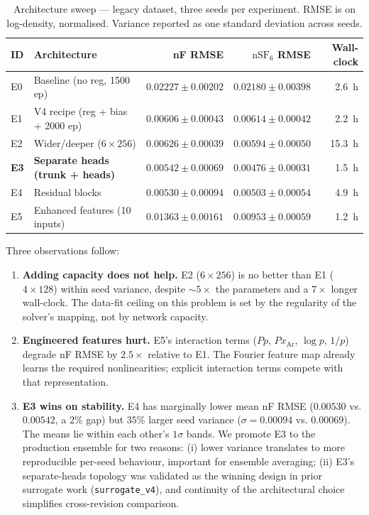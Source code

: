 \begin{table}[h]
\centering
\caption{Architecture sweep — legacy dataset, three seeds per experiment.
RMSE is on log-density, normalised. Variance reported as one standard deviation
across seeds.}
\label{tab:ml-arch-sweep}
\small
\begin{tabular}{l l r r r}
\toprule
ID & Architecture & nF RMSE & $\mathrm{nSF}_6$ RMSE & Wall-clock \\
\midrule
E0 & Baseline (no reg, 1500 ep)        & $0.02227 \pm 0.00202$ & $0.02180 \pm 0.00398$ & \SI{2.6}{\hour} \\
E1 & V4 recipe (reg + bias + 2000 ep)  & $0.00606 \pm 0.00043$ & $0.00614 \pm 0.00042$ & \SI{2.2}{\hour} \\
E2 & Wider/deeper ($6 \times 256$)     & $0.00626 \pm 0.00039$ & $0.00594 \pm 0.00050$ & \SI{15.3}{\hour} \\
\textbf{E3} & \textbf{Separate heads (trunk + heads)} & $\mathbf{0.00542 \pm 0.00069}$ & $\mathbf{0.00476 \pm 0.00031}$ & \SI{1.5}{\hour} \\
E4 & Residual blocks                   & $0.00530 \pm 0.00094$ & $0.00503 \pm 0.00054$ & \SI{4.9}{\hour} \\
E5 & Enhanced features (10 inputs)     & $0.01363 \pm 0.00161$ & $0.00953 \pm 0.00059$ & \SI{1.2}{\hour} \\
\bottomrule
\end{tabular}
\end{table}

Three observations follow:

\begin{enumerate}[itemsep=2pt,topsep=2pt]
  \item \textbf{Adding capacity does not help.} E2 ($6\times256$) is no better
  than E1 ($4\times128$) within seed variance, despite $\sim$$5\times$ the
  parameters and a $7\times$ longer wall-clock. The data-fit ceiling on this
  problem is set by the regularity of the solver's mapping, not by network
  capacity.
  \item \textbf{Engineered features hurt.} E5's interaction terms
  ($Pp$, $P x_\mathrm{Ar}$, $\log p$, $1/p$) degrade nF RMSE by
  $2.5\times$ relative to E1. The Fourier feature map already learns the
  required nonlinearities; explicit interaction terms compete with that
  representation.
  \item \textbf{E3 wins on stability.} E4 has marginally lower mean nF RMSE
  ($0.00530$ vs. $0.00542$, a $2\%$ gap) but $35\%$ larger seed variance
  ($\sigma=0.00094$ vs. $0.00069$). The means lie within each other's
  $1\sigma$ bands. We promote E3 to the production ensemble for two reasons:
  (i) lower variance translates to more reproducible per-seed behaviour,
  important for ensemble averaging; (ii) E3's separate-heads topology was
  validated as the winning design in prior surrogate work
  (\texttt{surrogate\_v4}), and continuity of the architectural choice
  simplifies cross-revision comparison.
\end{enumerate}

